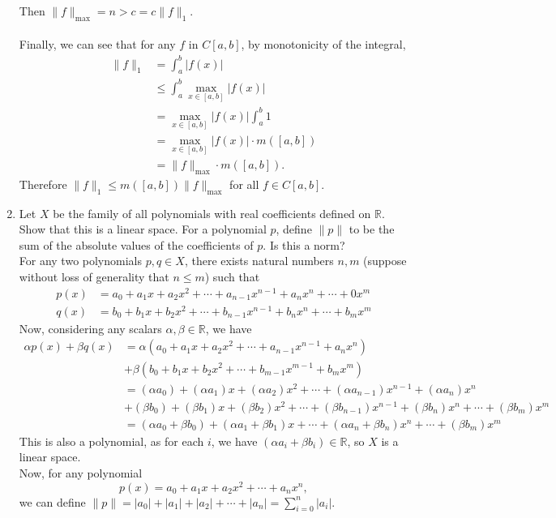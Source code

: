 \begin{enumerate}
	Then $\| f \|_{\max}=n > c =  c \| f \|_1$.\\
	\\
	Finally, we can see that for any $f$ in $C[a,b]$, by monotonicity of the integral, 
	\begin{align*}
	\|f\|_1 &= \int_a^b|f(x)|\\ 
	&\le \int_a^b\max_{x\in [a,b]}|f(x)|\\
	&=\max_{x\in [a,b]}|f(x)| \int_a^b1\\
	&= \max_{x\in [a,b]}|f(x)| \cdot m([a,b]) \\
	&= \|f\|_{\max} \cdot m([a,b]).
	\end{align*}
	Therefore $\|f\|_1\le m([a,b])\|f\|_{\max}$ for all $f\in C[a,b]$.
	\item Let $X$ be the family of all polynomials with real coefficients defined on $\mathbb{R}$.
	Show that this is a linear space. For a polynomial $p$, define $\| p\|$ to be the sum of the absolute values of the coefficients of $p$.
	Is this a norm?\\
	For any two polynomials $p,q\in X$, there exists natural numbers $n,m$ (suppose without loss of generality that $n\le m$) such that
	\begin{align*}
	p(x) &= a_0+a_1x+a_2x^2+\cdots+a_{n-1}x^{n-1}+a_nx^n+\cdots+0x^m	\\
	q(x) &= b_0+b_1x+b_2x^2+\cdots+b_{n-1}x^{n-1}+b_nx^n+\cdots+b_mx^m	
	\end{align*}
	Now, considering any scalars $\alpha,\beta \in \mathbb{R}$, we have
	\begin{align*}
		\alpha p(x) + \beta q(x) &= \alpha (a_0+a_1x+a_2x^2+\cdots+a_{n-1}x^{n-1}+a_nx^n)\\
		&+ \beta (b_0+b_1x+b_2x^2+\cdots+b_{m-1}x^{m-1}+b_mx^m)\\
		&=(\alpha a_0)+(\alpha a_1)x+(\alpha a_2)x^2+\cdots+(\alpha a_{n-1})x^{n-1}+(\alpha a_n)x^n\\
		&+ (\beta b_0)+(\beta b_1)x+(\beta b_2)x^2+\cdots+(\beta b_{n-1})x^{n-1}+(\beta b_n)x^n+\cdots+(\beta b_m)x^m\\
		&=(\alpha a_0+\beta b_0)+(\alpha a_1+\beta b_1)x+\cdots+(\alpha a_n+\beta b_n)x^n+\cdots+(\beta b_m)x^m
	\end{align*}
	This is also a polynomial, as for each $i$, we have $(\alpha a_i+\beta b_i) \in \mathbb{R}$, so $X$ is a linear space.\\
	Now, for any polynomial
	\[
		p(x) = a_0+a_1x+a_2x^2+\cdots+a_nx^n,	
	\]
	we can define $\|p\| = |a_0|+|a_1|+|a_2|+\cdots+|a_n| = \sum_{i=0}^n|a_i|$.\\

\end{enumerate}
